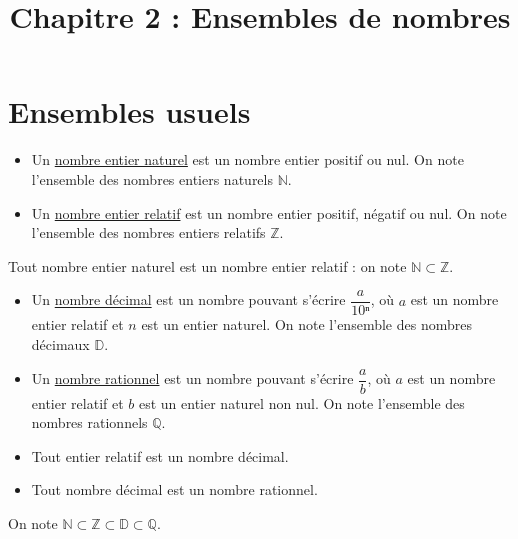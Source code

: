 \documentclass[classe=$2^{de}$]{coursclass}
\title{Chapitre 2 : Ensembles de nombres}
\date{}
\author{}
\begin{document}
\maketitle

\section{Ensembles usuels}

\begin{definition}[Entiers]
	\begin{itemize}
		\item Un \uline{nombre entier naturel} est un nombre entier positif ou nul. On note l'ensemble des nombres entiers naturels $ℕ$.
		\item Un \uline{nombre entier relatif} est un nombre entier positif, négatif ou nul. On note l'ensemble des nombres entiers relatifs $ℤ$. %
	\end{itemize}
\end{definition}

\begin{remarque}
	Tout nombre entier naturel est un nombre entier relatif : on note $ℕ ⊂ ℤ$.
\end{remarque}

\begin{definition}
	\begin{itemize}
		\item Un \uline{nombre décimal} est un nombre pouvant s'écrire $\dfrac{a}{10ⁿ}$, où $a$ est un nombre entier relatif et $n$ est un entier naturel. On note l'ensemble des nombres décimaux $𝔻$.
		\item Un \uline{nombre rationnel} est un nombre pouvant s'écrire $\dfrac{a}{b}$, où $a$ est un nombre entier relatif et $b$ est un entier naturel non nul. On note l'ensemble des nombres rationnels $ℚ$. %
	\end{itemize}
\end{definition}

\begin{remarque}
	\begin{itemize}
		\item Tout entier relatif est un nombre décimal.
		\item Tout nombre décimal est un nombre rationnel.
	\end{itemize}
	On note $ℕ ⊂ ℤ ⊂ 𝔻 ⊂ ℚ$.
\end{remarque}
\end{document}
